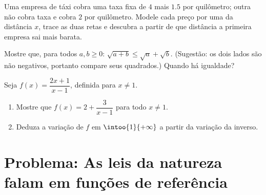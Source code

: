 \begin{exercise}[$\star\star$]\label{exo:g10:reffunc:8}
Uma empresa de táxi cobra uma taxa fixa de $4$ mais $1.5$ por
quilômetro; outra não cobra taxa e cobra $2$ por quilômetro. Modele cada
preço por uma  da distância $x$, trace as duas retas e
descubra a partir de que distância a primeira empresa sai mais barata.
\end{exercise}

\begin{exercise}[$\star\star$]\label{exo:g10:reffunc:9}
Mostre que, para todos $a, b \geq 0$: $\sqrt{a + b} \leq \sqrt a +
\sqrt b$. (Sugestão: os dois lados são não negativos, portanto compare
seus quadrados.) Quando há igualdade?
\end{exercise}

\begin{exercise}[$\star\star\star$]\label{exo:g10:reffunc:10}
Seja $f(x) = \dfrac{2x + 1}{x - 1}$, definida para $x \neq 1$.
\begin{enumerate}
  \item Mostre que $f(x) = 2 + \dfrac{3}{x - 1}$ para todo $x \neq 1$.
  \item Deduza a variação de $f$ em $\intoo{1}{+\infty}$ a partir da
        variação da  inverso.
\end{enumerate}
\end{exercise}

\section{Problema: As leis da natureza falam em funções de referência}

